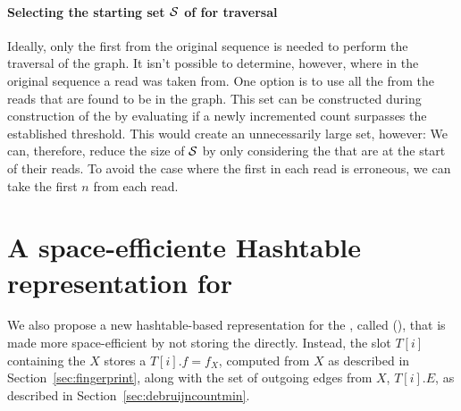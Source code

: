 \paragraph{Selecting the starting set $\strsetname{S}$ of  for traversal} Ideally, only the first \kmer from the original sequence is needed to perform the traversal of the graph. It isn't possible to determine, however, where in the original sequence a read was taken from. One option is to use all the  from the reads that are found to be in the graph. This set can be constructed during construction of the \dBCM by evaluating if a newly incremented  count surpasses the established threshold. This would create an unnecessarily large set, however:  We can, therefore, reduce the size of $\strsetname{S}$ by only considering the  that are at the start of their reads. To avoid the case where the first \kmer in each read is erroneous, we can take the first $n$  from each read. 

\section{A space-efficiente Hashtable representation for }
\label{sec:debruijnhashtable}

We also propose a new hashtable-based representation for the \dBG, called  (\dBHT), that is made more space-efficient by not storing the \kmer directly. Instead, the slot $T[i]$ containing the \kmer $X$ stores a  $T[i].f = f_X$, computed from $X$ as described in Section~\ref{sec:fingerprint}, along with the set of outgoing edges from $X$, $T[i].E$,  as described in Section~\ref{sec:debruijncountmin}.

